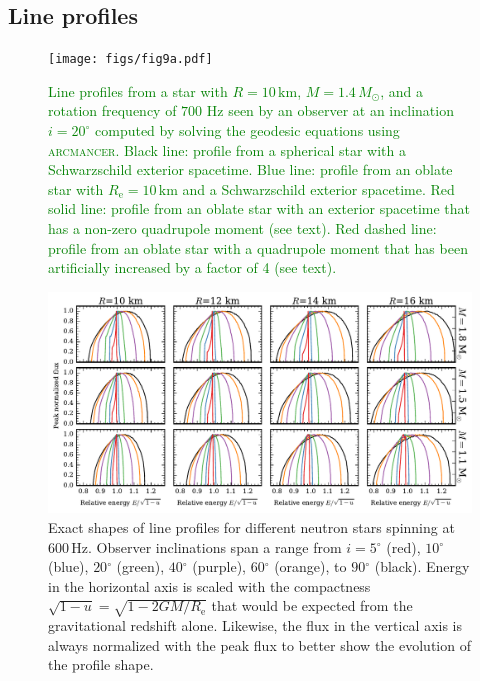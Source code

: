 \documentclass{aa}
\newcommand{\refe}[1]{\textcolor{green}{{#1}}}
\newcommand{\Msun}{\ensuremath{M_{\odot}}}
\renewcommand{\deg}{\ensuremath{^{\circ}}}
\begin{document}
\subsection{Line profiles}

\begin{figure}
\texttt{[image: figs/fig9a.pdf]}
\caption{\label{fig:line_profiles}
    \refe{
Line profiles from a star with $R = 10\,\mathrm{km}$, $M = 1.4\,\Msun$, and a rotation frequency of $700$ Hz seen by an observer at an inclination $i = 20^{\circ}$ \refe{computed by solving the geodesic equations using \textsc{arcmancer}}.
Black line: profile from a spherical star with a Schwarzschild exterior spacetime. 
Blue line: profile from an oblate star with $R_{\mathrm{e}} = 10\,\mathrm{km}$ and a Schwarzschild exterior spacetime. 
Red solid line: profile from an oblate star with an exterior spacetime that has a non-zero quadrupole moment (see text). 
    Red dashed line: profile from an oblate star with a quadrupole moment that has been artificially increased by a factor of 4 (see text).
    }
}
\end{figure}



\begin{figure}[htbp!]
\centering
    \includegraphics[width=18cm]{figs/sweep_grid.pdf}
\caption{\label{fig:sweep}
    Exact shapes of line profiles for different neutron stars spinning at $600\,\mathrm{Hz}$.
Observer inclinations span a range from $i=5\deg$ (red), $10\deg$ (blue), $20\deg$ (green), $40\deg$ (purple), $60\deg$ (orange), to $90\deg$ (black).
Energy in the horizontal axis is scaled with the compactness $\sqrt{1-u} = \sqrt{1-2GM/R_{\mathrm{e}}}$ that would be expected from the gravitational redshift alone.
Likewise, the flux in the vertical axis is always normalized with the peak flux to better show the evolution of the profile shape.
}
\end{figure}
\end{document}
